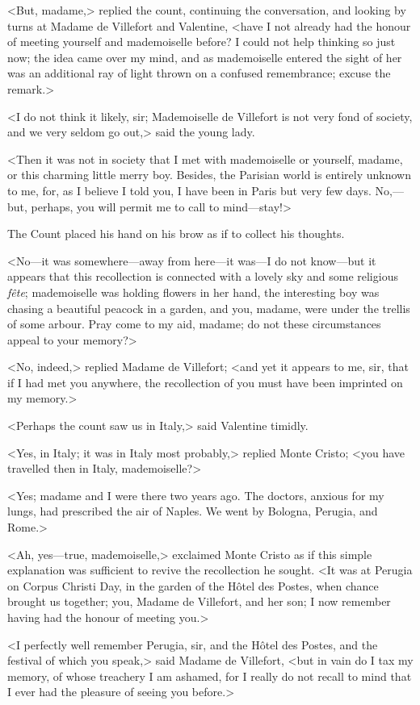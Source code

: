  <But, madame,> replied the count, continuing the conversation, and looking by turns at Madame de Villefort and Valentine, <have I not already had the honour of meeting yourself and mademoiselle before? I could not help thinking so just now; the idea came over my mind, and as mademoiselle entered the sight of her was an additional ray of light thrown on a confused remembrance; excuse the remark.> 

 <I do not think it likely, sir; Mademoiselle de Villefort is not very fond of society, and we very seldom go out,> said the young lady. 

 <Then it was not in society that I met with mademoiselle or yourself, madame, or this charming little merry boy. Besides, the Parisian world is entirely unknown to me, for, as I believe I told you, I have been in Paris but very few days. No,—but, perhaps, you will permit me to call to mind—stay!> 

 The Count placed his hand on his brow as if to collect his thoughts. 

 <No—it was somewhere—away from here—it was—I do not know—but it appears that this recollection is connected with a lovely sky and some religious \textit{fête}; mademoiselle was holding flowers in her hand, the interesting boy was chasing a beautiful peacock in a garden, and you, madame, were under the trellis of some arbour. Pray come to my aid, madame; do not these circumstances appeal to your memory?> 

 <No, indeed,> replied Madame de Villefort; <and yet it appears to me, sir, that if I had met you anywhere, the recollection of you must have been imprinted on my memory.> 

 <Perhaps the count saw us in Italy,> said Valentine timidly. 

 <Yes, in Italy; it was in Italy most probably,> replied Monte Cristo; <you have travelled then in Italy, mademoiselle?> 

 <Yes; madame and I were there two years ago. The doctors, anxious for my lungs, had prescribed the air of Naples. We went by Bologna, Perugia, and Rome.> 

 <Ah, yes—true, mademoiselle,> exclaimed Monte Cristo as if this simple explanation was sufficient to revive the recollection he sought. <It was at Perugia on Corpus Christi Day, in the garden of the Hôtel des Postes, when chance brought us together; you, Madame de Villefort, and her son; I now remember having had the honour of meeting you.> 

 <I perfectly well remember Perugia, sir, and the Hôtel des Postes, and the festival of which you speak,> said Madame de Villefort, <but in vain do I tax my memory, of whose treachery I am ashamed, for I really do not recall to mind that I ever had the pleasure of seeing you before.> 

